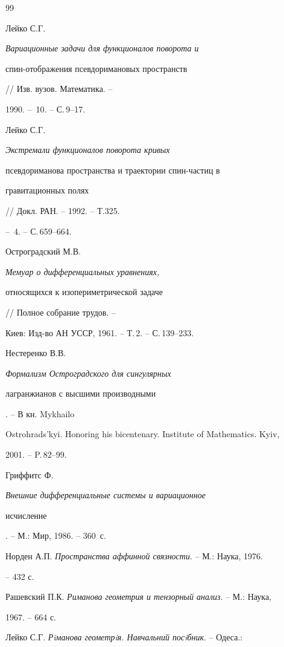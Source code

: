 \begin{thebibliography}{99} 


 




Лейко С.Г. {\em Вариационные задачи для функционалов поворота и 


спин-отображения псевдоримановых пространств} // Изв. вузов. Математика. -- 


1990. -- \No\,10. -- С.\,9--17. 




Лейко С.Г. {\em Экстремали функционалов поворота кривых 


псевдориманова пространства и траектории спин-частиц в 


гравитационных полях} // Докл. РАН. -- 1992. -- Т.325. 


-- \No\,4. -- С.\,659--664. 




Остроградский М.В. {\em Мемуар о дифференциальных уравнениях, 


относящихся к изопериметрической задаче} // Полное собрание трудов. -- 


Киев: Изд-во АН УССР, 1961. -- Т.\,2. -- С.\,139--233.




Нестеренко В.В. {\em Формализм Остроградского для сингулярных 


лагранжианов с высшими производными}. -- В кн. Mykhailo 


Ostrohrads'kyi. Honoring his bicentenary. Institute of Mathematics. Kyiv, 


2001. -- P.\,82--99. 




Гриффитс Ф. {\em Внешние дифференциальные системы и вариационное 


исчисление}. -- М.: Мир, 1986. -- 360~с. 




Норден А.П. {\em Пространства аффинной связности}. -- М.: Наука, 1976. 


-- 432 с. 




Рашевский П.К. {\em Риманова геометрия и тензорный анализ}. -- М.: Наука, 


1967. -- 664 с. 




Лейко С.Г. {\em Рiманова геометрiя. Навчальний посiбник}. -- Одеса.: 



\end{thebibliography}
